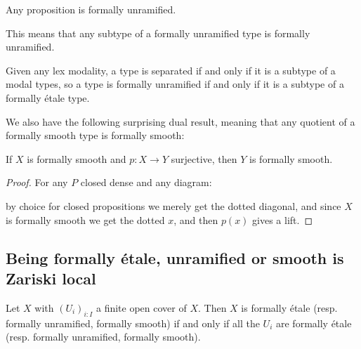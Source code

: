 \begin{lemma}\label{prop-are-unramified}
Any proposition is formally unramified.
\end{lemma}

This means that any subtype of a formally unramified type is formally unramified.

\begin{remark}
Given any lex modality, a type is separated if and only if it is a subtype of a modal types, so a type is formally unramified if and only if it is a subtype of a formally étale type.
\end{remark}

We also have the following surprising dual result, meaning that any quotient of a formally smooth type is formally smooth:

\begin{proposition}
\label{smoothSurjective}
If $X$ is formally smooth and $p:X\to Y$ surjective, then $Y$ is formally smooth.
\end{proposition}

\begin{proof}
For any $P$ closed dense and any diagram:
 \begin{center}
    \end{center} 
    by choice for closed propositions we merely get the dotted diagonal, and since $X$ is formally smooth we get the dotted $x$, and then $p(x)$ gives a lift.
\end{proof}


\subsection{Being formally étale, unramified or smooth is Zariski local}

\begin{lemma}\label{etale-zariski-local}
Let $X$ with $(U_i)_{i:I}$ a finite open cover of $X$. Then $X$ is formally étale (resp. formally unramified, formally smooth) if and only if all the $U_i$ are formally étale (resp. formally unramified, formally smooth).
\end{lemma}


